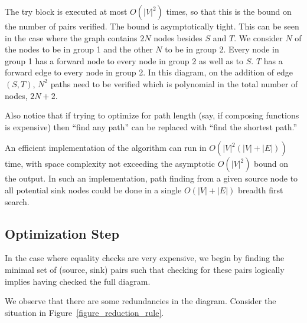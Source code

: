 \documentclass[sigplan,review,anonymous]{acmart}
\begin{document}
{The try block is executed at most $O(|V|^2)$ times, so that this is the bound on the number of pairs verified.
%
The bound is asymptotically tight. This can be seen in the case where the graph contains $2N$ nodes besides $S$ and $T$.
We consider $N$ of the nodes to be in group 1 and the other $N$ to be in group 2. Every node in group 1 has a forward node to every node in group 2 as well as to $S$. $T$ has a forward edge to every node in group 2. In this diagram, on the addition of edge $(S, T)$, $N^2$ paths need to be verified which is polynomial in the total number of nodes, $2N+2$.

Also notice that if trying to optimize for path length (say, if composing functions is expensive) then ``find any path'' can be replaced with ``find the shortest path.''

An efficient implementation of the algorithm can run in $O(|V|^2(|V|+|E|))$ time, with space complexity not exceeding the asymptotic $O(|V|^2)$ bound on the output.
In such an implementation, path finding from a given source node to all potential sink nodes could be done in a single $O(|V|+|E|)$ breadth first search.

\subsection{Optimization Step}

In the case where equality checks are very expensive, we begin by finding the minimal set of (source, sink) pairs such that checking for these pairs logically implies having checked the full diagram.

We observe that there are some redundancies in the diagram.
%
Consider the situation in Figure~\ref{figure_reduction_rule}.

}
\end{document}
